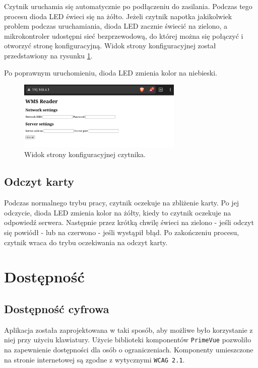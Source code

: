 Czytnik uruchamia się automatycznie po podłączeniu do zasilania. Podczas tego procesu dioda LED świeci się na żółto. Jeżeli czytnik napotka jakikolwiek problem podczas uruchamiania, dioda LED zacznie świecić na zielono, a mikrokontroler udostępni sieć bezprzewodową, do której można się połączyć i otworzyć stronę konfiguracyjną. Widok strony konfiguracyjnej został przedstawiony na rysunku \ref{fig:readerConfig}.

Po poprawnym uruchomieniu, dioda LED zmienia kolor na niebieski.

\begin{figure}[H]
    \centering
    \includegraphics[width=0.7\textwidth, frame]{graf/readerSetup.jpg}
    \caption{Widok strony konfiguracyjnej czytnika.}
    \label{fig:readerConfig}
\end{figure}

\subsection{Odczyt karty}

Podczas normalnego trybu pracy, czytnik oczekuje na zbliżenie karty. Po jej odczycie, dioda LED zmienia kolor na żółty, kiedy to czytnik oczekuje na odpowiedź serwera. Następnie przez krótką chwilę świeci na zielono - jeśli odczyt się powiódł - lub na czerwono - jeśli wystąpił błąd. Po zakończeniu procesu, czytnik wraca do trybu oczekiwania na odczyt karty.

\section{Dostępność}

\subsection{Dostępność cyfrowa}

Aplikacja została zaprojektowana w taki sposób, aby możliwe było korzystanie z niej przy użyciu klawiatury. Użycie biblioteki komponentów \texttt{PrimeVue} pozwoliło na zapewnienie dostępności dla osób o ograniczeniach. Komponenty umieszczone na stronie internetowej są zgodne z wytycznymi \texttt{WCAG 2.1}. \cite{bib:WCAG21}

